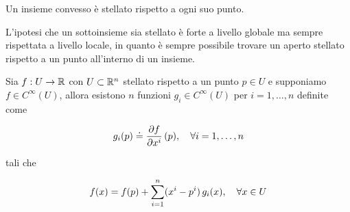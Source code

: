 \begin{remark}
	Un insieme convesso è stellato rispetto a ogni suo punto.
\end{remark}

L'ipotesi che un sottoinsieme sia stellato è forte a livello globale ma sempre rispettata a livello locale, in quanto è sempre possibile trovare un aperto stellato rispetto a un punto all'interno di un insieme.

\begin{theorem}
	Sia $ f : U \to \mathbb{R} $ con $ U \subset \mathbb{R}^{n} $ stellato rispetto a un punto $ p \in U $ e supponiamo $ f \in C^{\infty}(U) $, allora esistono $ n $ funzioni $ g_{i} \in C^{\infty}(U) $ per $ i = 1,\dots,n $ definite come
	
	\begin{equation}
		g_{i}(p) \doteq \pdv{f}{x^{i}} \, (p) \qcomma \forall i=1,\dots,n
	\end{equation}

	tali che
	
	\begin{equation}
		f(x) = f(p) + \sum_{i=1}^{n} (x^{i}-p^{i}) \, g_{i}(x) \qcomma \forall x \in U
	\end{equation}	
\end{theorem}

